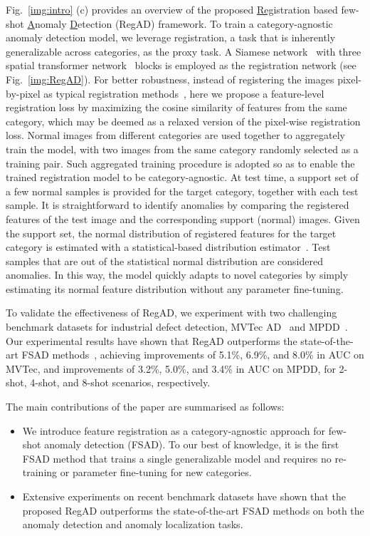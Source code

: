 \documentclass[runningheads]{llncs}
\begin{document}
Fig.~\ref{img:intro} (c) provides an overview of the proposed \underline{Reg}istration based few-shot \underline{A}nomaly \underline{D}etection (RegAD) framework. To train a category-agnostic anomaly detection model, we leverage registration, a task that is inherently generalizable across categories, as the proxy task. A Siamese network~\cite{chen2021exploring} with three spatial transformer network~\cite{STN} blocks is employed as the registration network (see Fig.~\ref{img:RegAD}). For better robustness, instead of registering the images pixel-by-pixel as typical registration methods~\cite{peng2011brainaligner}, here we propose a feature-level registration loss by maximizing the cosine similarity of features from the same category, which may be deemed as a relaxed version of the pixel-wise registration loss. Normal images from different categories are used together to aggregately train the model, with two images from the same category randomly selected as a training pair. Such aggregated training procedure is adopted so as to enable the trained registration model to be category-agnostic. At test time, a support set of a few normal samples is provided for the target category, together with each test sample. It is straightforward to identify anomalies by comparing the registered features of the test image and the corresponding support (normal) images. Given the support set, the normal distribution of registered features for the target category is estimated with a statistical-based distribution estimator~\cite{defard2021padim}. Test samples that are out of the statistical normal distribution are considered anomalies. In this way, the model quickly adapts to novel categories by simply estimating its normal feature distribution without any parameter fine-tuning.

To validate the effectiveness of RegAD, we experiment with two challenging benchmark datasets for industrial defect detection, MVTec AD~\cite{bergmann2019mvtec} and MPDD~\cite{jezek2021deep}. Our experimental results have shown that RegAD outperforms the state-of-the-art FSAD methods~\cite{TDG,DiffNet}, achieving improvements of 5.1\%, 6.9\%, and 8.0\% in AUC on MVTec, and improvements of 3.2\%, 5.0\%, and 3.4\% in AUC on MPDD, for 2-shot, 4-shot, and 8-shot scenarios, respectively.

The main contributions of the paper are summarised as follows:
\begin{itemize}
  \item We introduce feature registration as a category-agnostic approach for few-shot anomaly detection (FSAD). To our best of knowledge, it is the first FSAD method that trains a single generalizable model and requires no re-training or parameter fine-tuning for new categories.
  \item Extensive experiments on recent benchmark datasets have shown that the proposed RegAD outperforms the state-of-the-art FSAD methods on both the anomaly detection and anomaly localization tasks.
\end{itemize}
\end{document}
